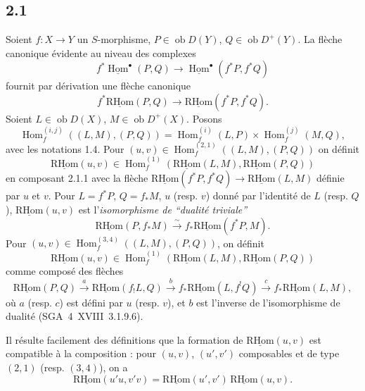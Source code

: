 \documentclass[11pt]{article}
\DeclareMathOperator{\Hom}{Hom}
\newcommand{\R}{\mathrm{R}}\newcommand{\RHomCore}{\mathrm{RHom}}
\newcommand{\ob}{\operatorname{ob}}
\providecommand{\RHom}{\RHomCore}
\providecommand{\uRHom}{\underline{\RHom}}
\providecommand{\RHom}{\RHomCore}
\providecommand{\Hom}{\operatorname{Hom}}
\providecommand{\ob}{\operatorname{ob}}
\providecommand{\RHom}{\R\mathcal{H}om}
\providecommand{\R}{\mathrm R}
\providecommand{\RHom}{\RHomCore}
\providecommand{\Hom}{\operatorname{Hom}}
\begin{document}
\subsection*{2.1}
Soient $f:X\to Y$ un $S$-morphisme, $P\in\ob D(Y)$, $Q\in\ob D^{+}(Y)$. La flèche canonique évidente au niveau des complexes
\[
f^{*}\underline{\Hom}^{\bullet}(P,Q)\longrightarrow\underline{\Hom}^{\bullet}(f^{*}P,f^{*}Q)
\]
fournit par dérivation une flèche canonique
\begin{equation}\tag{2.1.1}
f^{*}\uRHom(P,Q)\longrightarrow\uRHom(f^{*}P,f^{*}Q).
\end{equation}
Soient $L\in\ob D(X)$, $M\in\ob D^{+}(X)$. Posons
\begin{equation}\tag{2.1.2}
\Hom_f^{(i,j)}((L,M),(P,Q))=\Hom_f^{(i)}(L,P)\times\Hom_f^{(j)}(M,Q),
\end{equation}
avec les notations 1.4. Pour $(u,v)\in\Hom_f^{(2,1)}((L,M),(P,Q))$ on définit
\begin{equation}\tag{2.1.3}
\uRHom(u,v)\in\Hom_f^{(1)}(\uRHom(L,M),\uRHom(P,Q))
\end{equation}
en composant 2.1.1 avec la flèche $\uRHom(f^{*}P,f^{*}Q)\to\uRHom(L,M)$ définie par $u$ et $v$. Pour $L=f^{*}P$, $Q=f_{*}M$, $u$ (resp. $v$) donné par l'identité de $L$ (resp. $Q$), $\uRHom(u,v)$ est l'\emph{isomorphisme de ``dualité triviale''}
\begin{equation}\tag{2.1.4}
\uRHom(P,f_{*}M)\xrightarrow{\sim}f_{*}\uRHom(f^{*}P,M).
\end{equation}
Pour $(u,v)\in\Hom_f^{(3,4)}((L,M),(P,Q))$, on définit
\begin{equation}\tag{2.1.5}
\uRHom(u,v)\in\Hom_f^{(1)}(\uRHom(L,M),\uRHom(P,Q))
\end{equation}
comme composé des flèches
\[
\uRHom(P,Q)\xrightarrow{a}\uRHom(f_{!}L,Q)\xrightarrow{b}f_{*}\uRHom(L,f^{!}Q)\xrightarrow{c}f_{*}\uRHom(L,M),
\]
où $a$ (resp. $c$) est défini par $u$ (resp. $v$), et $b$ est l'inverse de l'isomorphisme de dualité (SGA~4~XVIII~3.1.9.6).

Il résulte facilement des définitions que la formation de $\uRHom(u,v)$ est compatible à la composition : pour $(u,v)$, $(u',v')$ composables et de type $(2,1)$ (resp. $(3,4)$), on a
\begin{equation}\tag{2.1.6}
\uRHom(u'u,v'v)=\uRHom(u',v')\,\uRHom(u,v).
\end{equation}

\end{document}
